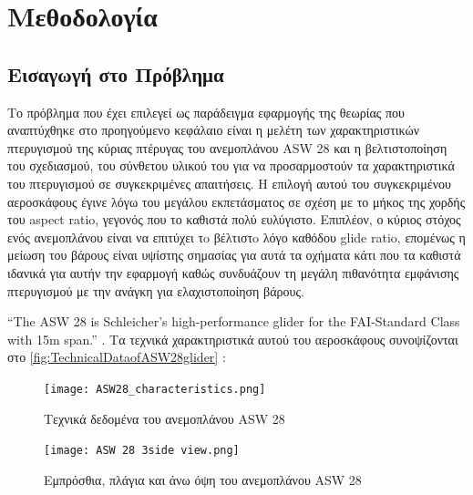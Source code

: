 \chapter{Μεθοδολογία}
\label{Ch:methodology}

\section{Εισαγωγή στο Πρόβλημα}
\label{problem-introduction}

Το πρόβλημα που έχει επιλεγεί ως παράδειγμα εφαρμογής της θεωρίας που αναπτύχθηκε στο προηγούμενο κεφάλαιο είναι η μελέτη των χαρακτηριστικών πτερυγισμού της κύριας πτέρυγας του ανεμοπλάνου \textlatin{ASW 28} και η  βελτιστοποίηση του σχεδιασμού, του σύνθετου υλικού του για να προσαρμοστούν τα χαρακτηριστικά του πτερυγισμού σε συγκεκριμένες απαιτήσεις. Η επιλογή αυτού του συγκεκριμένου αεροσκάφους έγινε λόγω του μεγάλου εκπετάσματος σε σχέση με το μήκος της χορδής του \textlatin{aspect ratio}, γεγονός που το καθιστά πολύ ευλύγιστο. Επιπλέον, ο κύριος στόχος ενός ανεμοπλάνου είναι να επιτύχει τo βέλτιστo λόγο καθόδου \textlatin{glide ratio}, επομένως η μείωση του βάρους είναι υψίστης σημασίας για αυτά τα οχήματα κάτι που τα καθιστά ιδανικά για αυτήν την εφαρμογή καθώς συνδυάζουν τη μεγάλη πιθανότητα εμφάνισης πτερυγισμού με την ανάγκη για ελαχιστοποίηση βάρους.

\textlatin{``The ASW 28 is Schleicher's high-performance glider for the
FAI-Standard Class with 15m span.'' \cite{asw28}}. Τα τεχνικά χαρακτηριστικά αυτού του αεροσκάφους συνοψίζονται στο \autoref{fig:TechnicalDataofASW28glider} :


\begin{figure}[H]
\centering
\texttt{[image: ASW28\_characteristics.png]}
\caption{Τεχνικά δεδομένα του ανεμοπλάνου \textlatin{ASW 28 \cite{asw28}}}
\label{fig:TechnicalDataofASW28glider}
\end{figure}

\begin{figure}[H]
\centering
\texttt{[image: ASW 28 3side view.png]}
\caption{Εμπρόσθια, πλάγια και άνω όψη του ανεμοπλάνου  \textlatin{ASW 28 \cite{asw28}}}
\end{figure}

